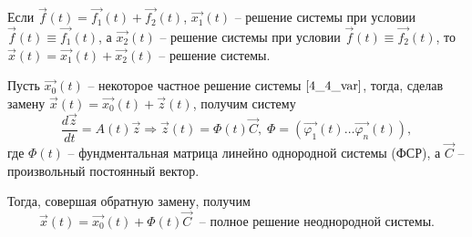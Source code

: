 \begin{lemma}
  Если $\overrightarrow{f}(t) = \overrightarrow{f_1}(t) + \overrightarrow{f_2}(t)$, $\overrightarrow{x_1}(t)$ -- решение системы при условии $\overrightarrow{f}(t) \equiv \overrightarrow{f_1}(t)$, а $\overrightarrow{x_2}(t)$ -- решение системы при условии $\overrightarrow{f}(t) \equiv \overrightarrow{f_2}(t)$, то $\overrightarrow{x}(t) = \overrightarrow{x_1}(t) + \overrightarrow{x_2}(t)$ -- решение системы.
\end{lemma}

\begin{proposition}
  Пусть $\overrightarrow{x_0}(t)$ -- некоторое частное решение системы $\eqref{4_4_var}$, тогда, сделав замену $\overrightarrow{x}(t) = \overrightarrow{x_0}(t) + \overrightarrow{z}(t)$, получим систему
  \begin{equation*}
    \frac{d \overrightarrow z}{dt} = A(t) \overrightarrow z \Rightarrow \overrightarrow z(t) = \varPhi(t) \overrightarrow C, \; \varPhi = \left( \overrightarrow{\varphi_1}(t) \dots \overrightarrow{\varphi_n}(t)\right),
  \end{equation*}
  где $\varPhi(t)$ -- фундментальная матрица линейно однородной системы (ФСР), а $\overrightarrow C$ -- произвольный постоянный вектор.

  Тогда, совершая обратную замену, получим
  \begin{equation*}
    \overrightarrow{x}(t) = \overrightarrow{x_0}(t) + \varPhi(t) \overrightarrow C \; \text{ -- полное решение неоднородной системы.}
  \end{equation*}
\end{proposition}

